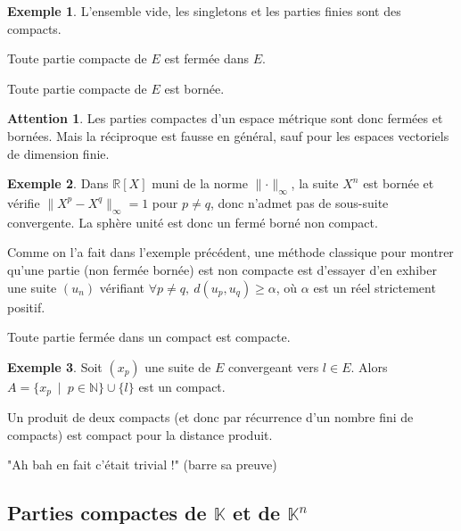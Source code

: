 \documentclass[french]{article}
\newcommand{\N}{\mathbb{N}}
\newcommand{\R}{\mathbb{R}}
\newcommand{\K}{\mathbb{K}}
\theoremstyle{plain}
\theoremstyle{definition}
\newtheorem*{ex}{Exemple}
\newtheorem*{attention}{Attention}
\theoremstyle{remark}
\begin{document}
\begin{ex}
	L'ensemble vide, les singletons et les parties finies sont des compacts.
\end{ex}

\begin{prop}
	Toute partie compacte de $E$ est fermée dans $E$.
\end{prop}

\begin{prop}
	Toute partie compacte de $E$ est bornée.
\end{prop}

\begin{attention}
	Les parties compactes d'un espace métrique sont donc fermées et bornées. Mais la réciproque est fausse en général, sauf pour les espaces vectoriels de dimension finie.
\end{attention}

\begin{ex}
	Dans $\R[X]$ muni de la norme $\lVert\cdot\rVert_\infty$, la suite $X^n$ est bornée et vérifie $\lVert X^p-X^q\rVert_\infty=1$ pour $p\ne q$, donc n'admet pas de sous-suite convergente. La sphère unité est donc un fermé borné non compact.
\end{ex}

\begin{met}
	Comme on l'a fait dans l'exemple précédent, une méthode classique pour montrer qu'une partie (non fermée bornée) est non compacte est d'essayer d'en exhiber une suite $(u_n)$ vérifiant $\forall p\ne q,\ d(u_p,u_q)\geqslant\alpha$, où $\alpha$ est un réel strictement positif.
\end{met}

\begin{prop}%
	Toute partie fermée dans un compact est compacte.
\end{prop}

\begin{ex}%
	Soit $(x_p)$ une suite de $E$ convergeant vers $l\in E$. Alors $A=\{x_p\ \mid\ p\in\N\}\cup\{l\}$ est un compact.
\end{ex}

\begin{prop}%
	Un produit de deux compacts (et donc par récurrence d'un nombre fini de compacts) est compact pour la distance produit.
\end{prop}
"Ah bah en fait c'était trivial !" (barre sa preuve)

\subsection{Parties compactes de $\K$ et de $\K^n$}
\end{document}
